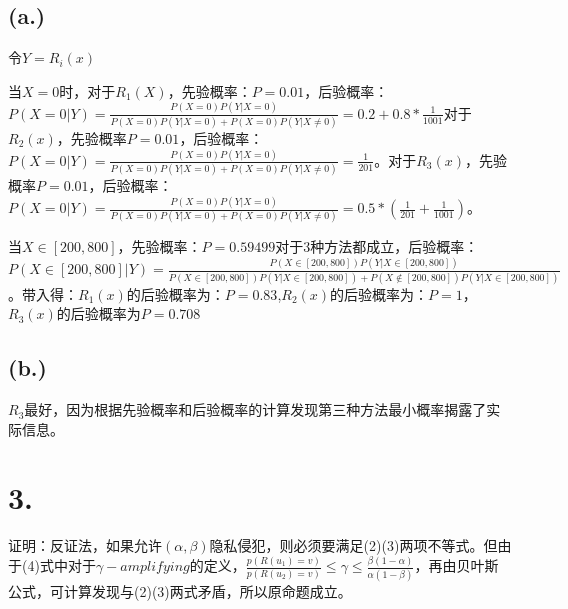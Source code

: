 \documentclass{article}
\begin{document}
	\subsection*{(a.)}
	令$Y=R_{i}(x)$\\
	 \par{当$X=0$时，对于$R_{1}(X)$，先验概率：$P=0.01$，后验概率：$P(X=0|Y)=\frac{P(X=0)P(Y|X=0)}{P(X=0)P(Y|X=0)+P(X=0)P(Y|X\neq 0)}=0.2+0.8*\frac{1}{1001}$对于$R_{2}(x)$，先验概率$P=0.01$，后验概率：$P(X=0|Y)=\frac{P(X=0)P(Y|X=0)}{P(X=0)P(Y|X=0)+P(X=0)P(Y|X\neq 0)}=\frac{1}{201}$。对于$R_{3}(x)$，先验概率$P=0.01$，后验概率：$P(X=0|Y)=\frac{P(X=0)P(Y|X=0)}{P(X=0)P(Y|X=0)+P(X=0)P(Y|X\neq 0)}=0.5*(\frac{1}{201}+\frac{1}{1001})$。}
	 \par{当$X\in [200,800]$，先验概率：$P=0.59499$对于3种方法都成立，后验概率：$P(X\in [200,800]|Y)=\frac{P(X\in [200,800])P(Y|X\in [200,800])}{P(X\in [200,800])P(Y|X\in [200,800])+P(X\notin [200,800])P(Y|X\in [200,800])}$。带入得：$R_{1}(x)$的后验概率为：$P=0.83$,$R_{2}(x)$的后验概率为：$P=1 $，$R_{3}(x)$的后验概率为$P=0.708$}
	 \subsection*{(b.)}
	 \par{$R_{3}$最好，因为根据先验概率和后验概率的计算发现第三种方法最小概率揭露了实际信息。}
	\section*{3.}
	\par{证明：反证法，如果允许$(\alpha,\beta)$隐私侵犯，则必须要满足(2)(3)两项不等式。但由于(4)式中对于$\gamma -amplifying$的定义，$\frac{p(R(u_{1})=v)}{p(R(u_{2})=v)}\le \gamma \le \frac{\beta (1-\alpha)}{\alpha (1-\beta)}$，再由贝叶斯公式，可计算发现与(2)(3)两式矛盾，所以原命题成立。}
	
\end{document}
